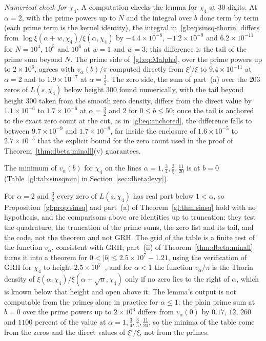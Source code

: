 \emph{Numerical check for $\chi_4$.} A computation checks the lemma for $\chi_4$ at $30$ digits. At $\alpha=2$, with the prime powers up to $N$ and the integral over $b$ done term by term (each prime term is the kernel identity), the integral in~\eqref{gl:eq:sinsq-thorin} differs from $\log\xi(\alpha+w,\chi_4)/\xi(\alpha,\chi_4)$ by $-4.4\times10^{-8}$, $-1.2\times10^{-9}$ and $6.2\times10^{-11}$ for $N=10^4$, $10^5$ and $10^6$ at $w=1$ and $w=3$; this difference is the tail of the prime sum beyond $N$. The prime side of~\eqref{gl:eq:Malpha}, over the prime powers up to $2\times10^6$, agrees with $v_\alpha(b)/\pi$ computed directly from $\xi'/\xi$ to $9.4\times10^{-11}$ at $\alpha=2$ and to $1.9\times10^{-7}$ at $\alpha=\tfrac32$. The zero side, the sum of part~(a) over the $203$ zeros of $L(s,\chi_4)$ below height $300$ found numerically, with the tail beyond height $300$ taken from the smooth zero density, differs from the direct value by $1.1\times10^{-6}$ to $1.7\times10^{-6}$ at $\alpha=\tfrac32$ and $2$ for $0\le b\le50$; once the tail is anchored to the exact zero count at the cut, as in~\eqref{gl:eq:anchored}, the difference falls to between $9.7\times10^{-9}$ and $1.7\times10^{-8}$, far inside the enclosure of $1.6\times10^{-5}$ to $2.7\times10^{-5}$ that the explicit bound for the zero count used in the proof of Theorem~\ref{thm:dbeta:minall}(v) guarantees.

The minimum of $v_\alpha(b)$ for $\chi_4$ on the lines $\alpha=1,\tfrac34,\tfrac35,\tfrac{11}{20}$ is at $b=0$ (Table~\ref{gl:tab:sinsqmin} in Section~\ref{sec:dbeta:levy}).

For $\alpha=2$ and $\tfrac32$ every zero of $L(s,\chi_4)$ has real part below $1<\alpha$, so Proposition~\ref{gl:prop:sinsq} and part~(a) of Theorem~\ref{gl:thm:sinsq} hold with no hypothesis, and the comparisons above are identities up to truncation: they test the quadrature, the truncation of the prime sums, the zero list and its tail, and the code, not the theorem and not GRH. The grid of the table is a finite test of the function $v_\alpha$, consistent with GRH; part~(ii) of Theorem~\ref{thm:dbeta:minall} turns it into a theorem for $0<|b|\le2.5\times10^7-1.21$, using the verification of GRH for $\chi_4$ to height $2.5\times10^7$~\cite{Platt16}, and for $\alpha<1$ the function $v_\alpha/\pi$ is the Thorin density of $\xi(\alpha,\chi_4)/\xi(\alpha+\sqrt u,\chi_4)$ only if no zero lies to the right of $\alpha$, which is known below that height and open above it. The lemma's output is not computable from the primes alone in practice for $\alpha\le1$: the plain prime sum at $b=0$ over the prime powers up to $2\times10^6$ differs from $v_\alpha(0)$ by $0.17$, $12$, $260$ and $1100$ percent of the value at $\alpha=1,\tfrac34,\tfrac35,\tfrac{11}{20}$, so the minima of the table come from the zeros and the direct values of $\xi'/\xi$, not from the primes.

